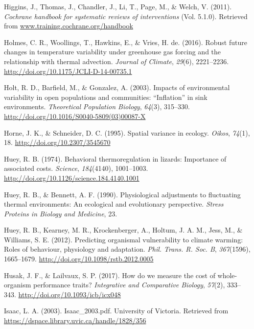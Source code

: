 \documentclass[12pt,twoside]{reedthesis}
\begin{document}
\leavevmode\hypertarget{ref-higgins_cochrane_2011}{}%
Higgins, J., Thomas, J., Chandler, J., Li, T., Page, M., \& Welch, V. (2011). \emph{Cochrane handbook for systematic reviews of interventions} (Vol. 5.1.0). Retrieved from \url{www.training.cochrane.org/handbook}

\leavevmode\hypertarget{ref-holmes_robust_2016}{}%
Holmes, C. R., Woollings, T., Hawkins, E., \& Vries, H. de. (2016). Robust future changes in temperature variability under greenhouse gas forcing and the relationship with thermal advection. \emph{Journal of Climate}, \emph{29}(6), 2221--2236. \url{http://doi.org/10.1175/JCLI-D-14-00735.1}

\leavevmode\hypertarget{ref-holt_impacts_2003}{}%
Holt, R. D., Barfield, M., \& Gonzalez, A. (2003). Impacts of environmental variability in open populations and communities: ``Inflation'' in sink environments. \emph{Theoretical Population Biology}, \emph{64}(3), 315--330. \url{http://doi.org/10.1016/S0040-5809(03)00087-X}

\leavevmode\hypertarget{ref-horne_spatial_1995}{}%
Horne, J. K., \& Schneider, D. C. (1995). Spatial variance in ecology. \emph{Oikos}, \emph{74}(1), 18. \url{http://doi.org/10.2307/3545670}

\leavevmode\hypertarget{ref-huey_behavioral_1974}{}%
Huey, R. B. (1974). Behavioral thermoregulation in lizards: Importance of associated costs. \emph{Science}, \emph{184}(4140), 1001--1003. \url{http://doi.org/10.1126/science.184.4140.1001}

\leavevmode\hypertarget{ref-huey_physiological_1990}{}%
Huey, R. B., \& Bennett, A. F. (1990). Physiological adjustments to fluctuating thermal environments: An ecological and evolutionary perspective. \emph{Stress Proteins in Biology and Medicine}, 23.

\leavevmode\hypertarget{ref-huey_predicting_2012}{}%
Huey, R. B., Kearney, M. R., Krockenberger, A., Holtum, J. A. M., Jess, M., \& Williams, S. E. (2012). Predicting organismal vulnerability to climate warming: Roles of behaviour, physiology and adaptation. \emph{Phil. Trans. R. Soc. B}, \emph{367}(1596), 1665--1679. \url{http://doi.org/10.1098/rstb.2012.0005}

\leavevmode\hypertarget{ref-husak_how_2017}{}%
Husak, J. F., \& Lailvaux, S. P. (2017). How do we measure the cost of whole-organism performance traits? \emph{Integrative and Comparative Biology}, \emph{57}(2), 333--343. \url{http://doi.org/10.1093/icb/icx048}

\leavevmode\hypertarget{ref-isaac_isaac_2003pdf_2003}{}%
Isaac, L. A. (2003). Isaac\_2003.pdf. University of Victoria. Retrieved from \url{https://dspace.library.uvic.ca/handle/1828/356}
\end{document}
